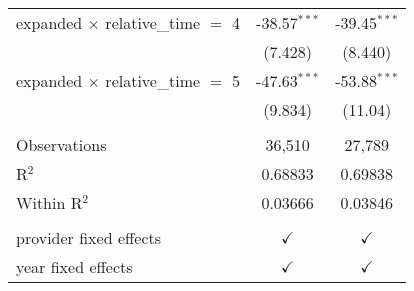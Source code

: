 \begin{tabular}{lcc}
   expanded $\times$ relative\_time $=$ 4     & -38.57$^{***}$ & -39.45$^{***}$\\   
                                              & (7.428)        & (8.440)\\   
   expanded $\times$ relative\_time $=$ 5     & -47.63$^{***}$ & -53.88$^{***}$\\   
                                              & (9.834)        & (11.04)\\   
    \\
   Observations                               & 36,510         & 27,789\\  
   R$^2$                                      & 0.68833        & 0.69838\\  
   Within R$^2$                               & 0.03666        & 0.03846\\  
    \\
   provider fixed effects                     & $\checkmark$   & $\checkmark$\\   
   year fixed effects                         & $\checkmark$   & $\checkmark$\\   
   \bottomrule
\end{tabular}
\par\endgroup


